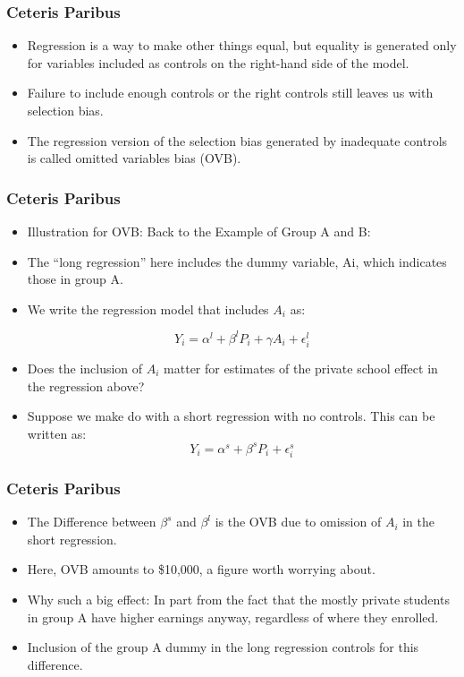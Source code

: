 \documentclass{beamer}
\begin{document}

\begin{frame}
\frametitle{Ceteris Paribus}
\newline 
\begin{itemize}
	\item Regression is a way to make other things equal, but equality is generated only for variables included as controls on the right-hand side of the model.
	\item Failure to include enough controls or the right controls still leaves us with selection bias.
	\item The regression version of the selection bias generated by inadequate controls is called omitted variables bias (OVB).
\end{itemize}

\end{frame}


\begin{frame}
\frametitle{Ceteris Paribus}
\begin{itemize}
	\item Illustration for OVB: Back to the Example of Group A and B:
	\item The “long regression” here includes the dummy variable, Ai, which indicates those in group A. 
	\item We write the regression model that includes $A_i$ as: 
	
	$$Y_i=\alpha^l + \beta^l P_i +\gamma A_i + \epsilon_i^l$$
	
	\item Does the inclusion of $A_i$ matter for estimates of the private school effect in the regression above?
	\item Suppose we make do with a short regression with no controls. This can be written as: 
	$$Y_i=\alpha^s + \beta^s P_i + \epsilon_i^s$$
\end{itemize}

\end{frame}

\begin{frame}
\frametitle{Ceteris Paribus}
\begin{itemize}
	\item The Difference between $\beta^s$ and $\beta^l$ is the OVB due to omission of $A_i$ in the short regression. 
	\item Here, OVB amounts to \$10,000, a figure worth worrying about.
	\item Why such a big effect: In part from the fact that the mostly private students in group A have higher earnings anyway, regardless of where they enrolled. 
	\item Inclusion of the group A dummy in the long regression controls for this difference.
\end{itemize}
\end{frame}
\end{document}
